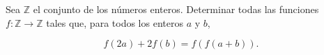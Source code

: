 Sea $\mathbb{Z}$ el conjunto de los números enteros. Determinar todas las funciones $f : \mathbb{Z} \to \mathbb{Z}$ tales que, para todos los enteros $a$ y $b$,

\[f(2a)+2f(b)=f(f(a+b)).\]